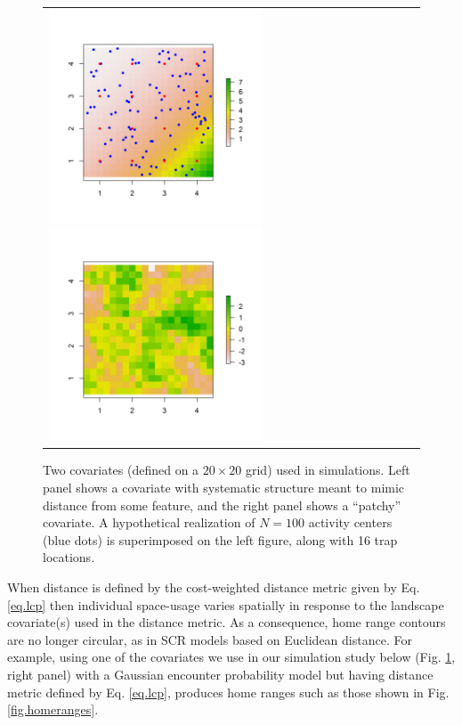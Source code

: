 \begin{figure}[h]
\begin{tabular}{ll}
\includegraphics[height=2.5in,width=2.5in]{Ch12-EcolDist/figs/raster_withN100}
\includegraphics[height=2.5in,width=2.5in]{Ch12-EcolDist/figs/raster_krige} &
\end{tabular}
\caption{Two covariates (defined on a $20 \times 20$ grid) used in simulations.
 Left panel shows a covariate with systematic structure meant
to mimic distance from some feature, and the right panel shows a ``patchy'' covariate.
A hypothetical realization of $N=100$ activity centers (blue dots) is superimposed
  on the left figure, along with 16 trap locations.
}
\label{ecoldist.fig.raster100}
\end{figure}


When distance is defined by the cost-weighted distance metric given
by Eq. \ref{eq.lcp} then individual space-usage varies
spatially in response to the landscape covariate(s) used in the
distance metric.  As a consequence, home range contours are no longer
circular, as in SCR models based on Euclidean distance.
For example, using one of the covariates we use in
our simulation study below (Fig. \ref{ecoldist.fig.raster100}, right
panel) with a Gaussian
encounter probability model but having distance
metric defined by Eq. \ref{eq.lcp}, produces home ranges such
as those shown in Fig. \ref{fig.homeranges}.


